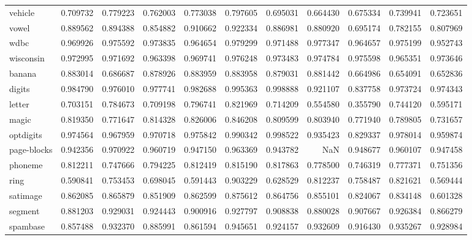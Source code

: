 \begin{tabular}{lrrrrrrrrrr}
vehicle         &   0.709732 &  0.779223 &  0.762003 &  0.773038 &  0.797605 &  0.695031 &  0.664430 &  0.675334 &  0.739941 &  0.723651 \\
vowel           &   0.889562 &  0.894388 &  0.854882 &  0.910662 &  0.922334 &  0.886981 &  0.880920 &  0.695174 &  0.782155 &  0.807969 \\
wdbc            &   0.969926 &  0.975592 &  0.973835 &  0.964654 &  0.979299 &  0.971488 &  0.977347 &  0.964657 &  0.975199 &  0.952743 \\
wisconsin       &   0.972995 &  0.971692 &  0.963398 &  0.969741 &  0.976248 &  0.973483 &  0.974784 &  0.975598 &  0.965351 &  0.973646 \\
banana          &   0.883014 &  0.686687 &  0.878926 &  0.883959 &  0.883958 &  0.879031 &  0.881442 &  0.664986 &  0.654091 &  0.652836 \\
digits          &   0.984790 &  0.976010 &  0.977741 &  0.982688 &  0.995363 &  0.998888 &  0.921107 &  0.837758 &  0.973724 &  0.974343 \\
letter          &   0.703151 &  0.784673 &  0.709198 &  0.796741 &  0.821969 &  0.714209 &  0.554580 &  0.355790 &  0.744120 &  0.595171 \\
magic           &   0.819350 &  0.771647 &  0.814328 &  0.826006 &  0.846208 &  0.809599 &  0.803940 &  0.771940 &  0.789805 &  0.731657 \\
optdigits       &   0.974564 &  0.967959 &  0.970718 &  0.975842 &  0.990342 &  0.998522 &  0.935423 &  0.829337 &  0.978014 &  0.959874 \\
page-blocks     &   0.942356 &  0.970922 &  0.960719 &  0.947150 &  0.963369 &  0.943782 &       NaN &  0.948677 &  0.960107 &  0.947458 \\
phoneme         &   0.812211 &  0.747666 &  0.794225 &  0.812419 &  0.815190 &  0.817863 &  0.778500 &  0.746319 &  0.777371 &  0.751356 \\
ring            &   0.590841 &  0.753453 &  0.698045 &  0.591443 &  0.903229 &  0.628529 &  0.812237 &  0.758487 &  0.821621 &  0.569444 \\
satimage        &   0.862085 &  0.865879 &  0.851909 &  0.862599 &  0.875612 &  0.864756 &  0.855101 &  0.824067 &  0.834148 &  0.601328 \\
segment         &   0.881203 &  0.929031 &  0.924443 &  0.900916 &  0.927797 &  0.908838 &  0.880028 &  0.907667 &  0.926384 &  0.866279 \\
spambase        &   0.857488 &  0.932370 &  0.885991 &  0.861594 &  0.945651 &  0.924157 &  0.932609 &  0.916430 &  0.935267 &  0.928984 \\

\end{tabular}
